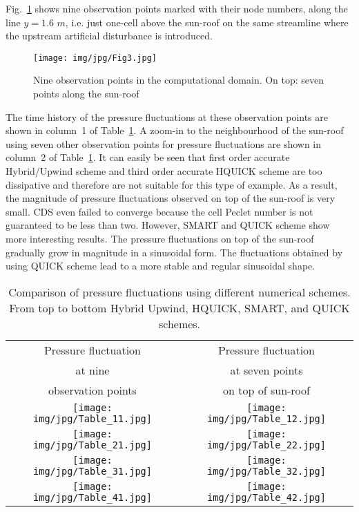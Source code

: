 \documentclass[10pt]{article}
\theoremstyle{plain}
\theoremstyle{definition}
\theoremstyle{remark}
\begin{document}
Fig.~\ref{Fig3} shows nine observation points marked with their node numbers, along the line $y = 1.6$ $m$, i.e. just one-cell above the sun-roof on the same streamline where the upstream artificial disturbance is introduced.
%
\begin{figure}[htbp]
\centering
\texttt{[image: img/jpg/Fig3.jpg]}
\caption{Nine observation points in the computational domain. On top: seven points along the sun-roof}\label{Fig3}
\end{figure}
%
The time history of the pressure fluctuations at these observation points are shown in column~1 of Table~\ref{Table1}.
A zoom-in to the neighbourhood of the sun-roof using seven other observation points for pressure fluctuations are shown in column~2 of Table~\ref{Table1}.
It can easily be seen that first order accurate Hybrid/Upwind scheme and third order accurate HQUICK scheme are too dissipative and therefore are not suitable for this type of example.
As a result, the magnitude of pressure fluctuations observed on top of the sun-roof is very small.
CDS even failed to converge because the cell Peclet number is not guaranteed to be less than two.
However, SMART and QUICK scheme show more interesting results.
The pressure fluctuations on top of the sun-roof gradually grow in magnitude in a sinusoidal form.
The fluctuations obtained by using QUICK scheme lead to a more stable and regular sinusoidal shape.
%
\begin{table}[htbp]
\begin{center}
\caption{Comparison of pressure fluctuations using different numerical schemes. From top to bottom Hybrid \/ Upwind, HQUICK, SMART, and QUICK schemes.}\label{Table1}
\begin{tabular}{cc}
Pressure fluctuation & Pressure fluctuation  \\
at nine              &  at seven points \\
observation points   &  on top of sun-roof \\
\texttt{[image: img/jpg/Table\_11.jpg]} & \texttt{[image: img/jpg/Table\_12.jpg]} \\
\texttt{[image: img/jpg/Table\_21.jpg]} & \texttt{[image: img/jpg/Table\_22.jpg]} \\
\texttt{[image: img/jpg/Table\_31.jpg]} & \texttt{[image: img/jpg/Table\_32.jpg]} \\
\texttt{[image: img/jpg/Table\_41.jpg]} & \texttt{[image: img/jpg/Table\_42.jpg]} \\
\end{tabular}
\end{center}
\end{table}
%
\end{document}
